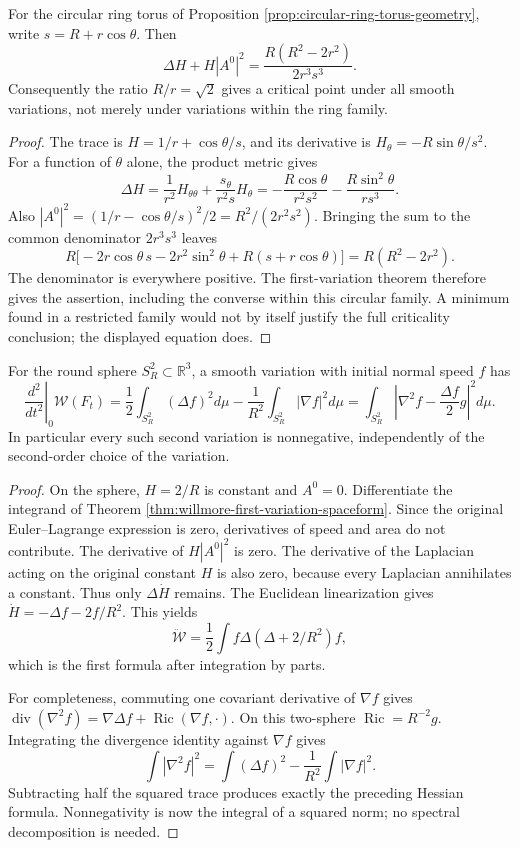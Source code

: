 \begin{proposition}\label{prop:ring-torus-willmore-equation}
For the circular ring torus of Proposition \ref{prop:circular-ring-torus-geometry}, write $s=R+r\cos\theta$. Then
\[
 \Delta H+H|A^0|^2=\frac{R(R^2-2r^2)}{2r^3s^3}.
\]
Consequently the ratio $R/r=\sqrt2$ gives a critical point under all smooth variations, not merely under variations within the ring family.
\end{proposition}
\begin{proof}
The trace is $H=1/r+\cos\theta/s$, and its derivative is $H_\theta=-R\sin\theta/s^2$. For a function of $\theta$ alone, the product metric gives
\[
 \Delta H=\frac1{r^2}H_{\theta\theta}+\frac{s_\theta}{r^2s}H_\theta
 =-\frac{R\cos\theta}{r^2s^2}-\frac{R\sin^2\theta}{rs^3}.
\]
Also $|A^0|^2=(1/r-\cos\theta/s)^2/2=R^2/(2r^2s^2)$. Bringing the sum to the common denominator $2r^3s^3$ leaves
\[
 R\bigl[-2r\cos\theta\,s-2r^2\sin^2\theta+R(s+r\cos\theta)\bigr]
 =R(R^2-2r^2).
\]
The denominator is everywhere positive. The first-variation theorem therefore gives the assertion, including the converse within this circular family. A minimum found in a restricted family would not by itself justify the full criticality conclusion; the displayed equation does.
\end{proof}

\begin{proposition}\label{prop:round-sphere-willmore-hessian}
For the round sphere $S_R^2\subset\mathbb R^3$, a smooth variation with initial normal speed $f$ has
\[
 \left.\frac{d^2}{dt^2}\right|_0\mathcal W(F_t)
 =\frac12\int_{S_R^2}(\Delta f)^2d\mu-\frac1{R^2}\int_{S_R^2}|\nabla f|^2d\mu
 =\int_{S_R^2}\left|\nabla^2f-\frac{\Delta f}{2}g\right|^2d\mu.
\]
In particular every such second variation is nonnegative, independently of the second-order choice of the variation.
\end{proposition}
\begin{proof}
On the sphere, $H=2/R$ is constant and $A^0=0$. Differentiate the integrand of Theorem \ref{thm:willmore-first-variation-spaceform}. Since the original Euler--Lagrange expression is zero, derivatives of speed and area do not contribute. The derivative of $H|A^0|^2$ is zero. The derivative of the Laplacian acting on the original constant $H$ is also zero, because every Laplacian annihilates a constant. Thus only $\Delta\dot H$ remains. The Euclidean linearization gives $\dot H=-\Delta f-2f/R^2$. This yields
\[
 \ddot{\mathcal W}=\frac12\int f\Delta(\Delta+2/R^2)f,
\]
which is the first formula after integration by parts.

For completeness, commuting one covariant derivative of $\nabla f$ gives $\operatorname{div}(\nabla^2f)=\nabla\Delta f+\operatorname{Ric}(\nabla f,\cdot)$. On this two-sphere $\operatorname{Ric}=R^{-2}g$. Integrating the divergence identity against $\nabla f$ gives
\[
 \int|\nabla^2f|^2=\int(\Delta f)^2-\frac1{R^2}\int|\nabla f|^2.
\]
Subtracting half the squared trace produces exactly the preceding Hessian formula. Nonnegativity is now the integral of a squared norm; no spectral decomposition is needed.
\end{proof}

